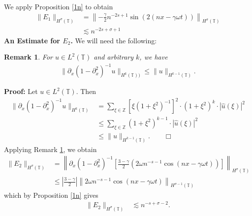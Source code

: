 \documentclass[12pt,reqno]{amsart}
\newcommand{\p}{\partial}
\newcommand{\zz}{\mathbb{Z}}
\newcommand{\ci}{\mathbb{T}}
\theoremstyle{plain}  %
\newtheorem{remark}{Remark}
\theoremstyle{definition}
\begin{document}
	We apply Proposition \ref{1n} to obtain
	\begin{equation}
		\label{85}
		\begin{split}
			\|E_1\|_{H^\sigma(\ci)}
			& = 
			\left\| - \frac{\gamma}{2}n^{-2s+1}\sin\left( 2\left(
			nx - \gamma \omega t \right)\right )
			\right\|_{H^\sigma(\ci)}
			\\
			& \lesssim
			n^{-2s + \sigma + 1}
		\end{split}
	\end{equation}
	{\bf An Estimate for $\hyperref[90**]{E_2}$.}
	We will need the following:
	\begin{remark}
		\label{lem:operator-norm-lemma}
		For $u \in L^2(\ci)$ and arbitrary $k$, we have
		\begin{equation}
			\begin{split}
				\|\p_x (1 -\p_x^2)^{-1}u \|_{H^{k}(\ci))} \le
				\|u\|_{H^{k-1}(\ci)}.
				\label{operator norm of pseudo-diff operator we use}
			\end{split}
		\end{equation}
	\end{remark}
	{\bf Proof:} Let $u \in L^2(\ci)$. Then
	\begin{equation*}
		\begin{split}
			\|\p_x \left( 1- \p_x^2 \right)^{-1} u \|_{H^{k}(\ci)}
			& = \sum_{\xi \in \zz}  \left[ \xi\left( 1+\xi^2 \right)^{-1} \right]^2
			\cdot \left( 1 + \xi^2 \right)^{k} \cdot |\hat{u}(\xi)|^2 
			\\
			& \le \sum_{\xi \in \zz}  \left( 1+ \xi^2 \right)^{k-1} \cdot 
			|\hat{u}(\xi)|^2 
			\\
			& \le \|u\|_{H^{k-1}(\ci)}.
			\qquad \Box
		\end{split}
	\end{equation*}
	Applying Remark \ref{lem:operator-norm-lemma}, we obtain
		\begin{equation}
		\begin{split}
			 \|E_2\|_{H^\sigma(\ci)} & = \left \|\p_x(1-\p_x^2)^{-1}
			\left[ \frac{3-\gamma}{2}
			\left( 2 \omega n^{-s -1}\cos( nx - \gamma \omega t )
			\right) \right] \right \|_{H^\sigma(\ci)}
			\\
			& \le \left |\frac{3-\gamma}{2}\right |
			\left \|2 \omega n^{-s -1}\cos( nx - \gamma \omega t )
			\right \|_{H^{\sigma -1 }(\ci)}
			\label{non-local_term_first_piece_without_constant}
		\end{split}
	\end{equation}
	which by Proposition \ref{1n} gives
		\begin{equation}
			\label{3.10}
		\begin{split}
			\|E_2\|_{H^\sigma(\ci)}
			& \lesssim n^{-s + \sigma -2}.
		\end{split}
	\end{equation}
\end{document}
